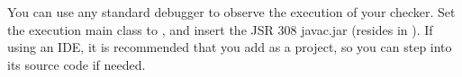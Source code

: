 You can use any standard debugger to observe the execution of your checker.
Set the execution main class to , and insert
the JSR 308 javac.jar (resides in
).  If using an IDE, it is
recommended that you add  as a project, so you
can step into its source code if needed.



